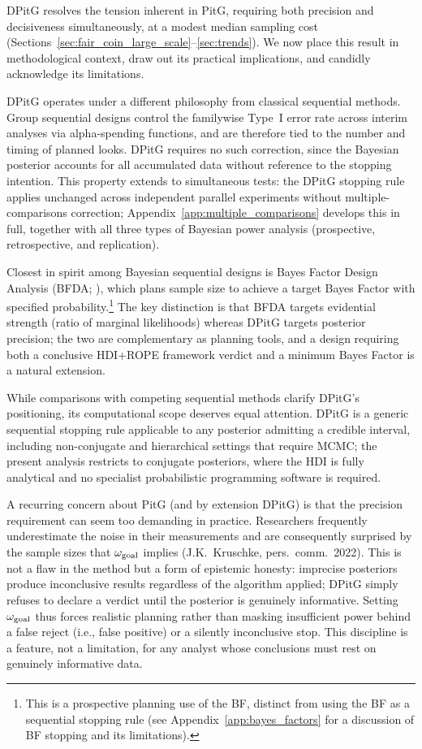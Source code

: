 DPitG resolves the tension inherent in PitG, requiring both precision and
decisiveness simultaneously, at a modest median sampling cost
(Sections~\ref{sec:fair_coin_large_scale}--\ref{sec:trends}).
We now place this result in methodological context, draw out its practical
implications, and candidly acknowledge its limitations.

DPitG operates under a different philosophy from classical sequential methods.
Group sequential designs \citep{jennison2000} control the familywise Type~I error rate
across interim analyses via alpha-spending functions, and are therefore tied to the
number and timing of planned looks.
DPitG requires no such correction, since the Bayesian posterior accounts for all
accumulated data without reference to the stopping intention.
This property extends to simultaneous tests: the DPitG stopping rule applies
unchanged across independent parallel experiments without multiple-comparisons
correction; Appendix~\ref{app:multiple_comparisons} develops this in full,
together with all three types of Bayesian power analysis (prospective,
retrospective, and replication).

Closest in spirit among Bayesian sequential designs is Bayes Factor Design Analysis
(BFDA; \citealt{schonbrodt2018}), which plans sample size to achieve a target Bayes
Factor with specified probability.\footnote{This is a prospective planning use of the BF, distinct from using the BF as a
sequential stopping rule (see Appendix~\ref{app:bayes_factors} for a discussion
of BF stopping and its limitations).}
The key distinction is that BFDA targets evidential strength (ratio of marginal
likelihoods) whereas DPitG targets posterior precision; the two are complementary
as planning tools, and a design requiring both a conclusive HDI+ROPE framework verdict and a
minimum Bayes Factor is a natural extension.

While comparisons with competing sequential methods clarify DPitG's positioning,
its computational scope deserves equal attention.
DPitG is a generic sequential stopping rule applicable to any posterior admitting a
credible interval, including non-conjugate and hierarchical settings that require MCMC;
the present analysis restricts to conjugate posteriors, where the HDI is fully
analytical and no specialist probabilistic programming software is required.


A recurring concern about PitG (and by extension DPitG) is that the precision
requirement can seem too demanding in practice.
Researchers frequently underestimate the noise in their measurements and are consequently surprised by the sample sizes that
$\omega_{\rm goal}$ implies (J.K.\ Kruschke, pers.\ comm.\ 2022). This is not a flaw
in the method but a form of epistemic honesty: imprecise posteriors produce inconclusive
results regardless of the algorithm applied; DPitG simply refuses to declare a verdict
until the posterior is genuinely informative. Setting $\omega_{\rm goal}$ thus forces
realistic planning rather than masking insufficient power behind a false reject (i.e., false positive) or a
silently inconclusive stop.
This discipline is a feature, not a limitation, for any analyst whose conclusions
must rest on genuinely informative data.

